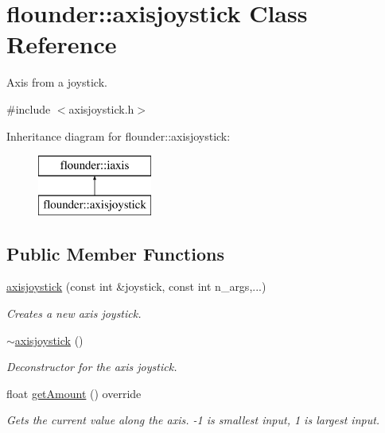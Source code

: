 \hypertarget{classflounder_1_1axisjoystick}{}\section{flounder\+:\+:axisjoystick Class Reference}
\label{classflounder_1_1axisjoystick}


Axis from a joystick.  




{\ttfamily \#include $<$axisjoystick.\+h$>$}

Inheritance diagram for flounder\+:\+:axisjoystick\+:\begin{figure}[H]
\begin{center}
\leavevmode
\includegraphics[height=2.000000cm]{classflounder_1_1axisjoystick}
\end{center}
\end{figure}
\subsection*{Public Member Functions}
\begin{DoxyCompactItemize}
\item 
\hyperlink{classflounder_1_1axisjoystick_a6415074e9ce0f9aae1d8071dc90a5f93}{axisjoystick} (const int \&joystick, const int n\+\_\+args,...)
\begin{DoxyCompactList}\small\item\em Creates a new axis joystick. \end{DoxyCompactList}\item 
\hyperlink{classflounder_1_1axisjoystick_aa006f728b79d1f0bd5101070782fcbb9}{$\sim$axisjoystick} ()
\begin{DoxyCompactList}\small\item\em Deconstructor for the axis joystick. \end{DoxyCompactList}\item 
float \hyperlink{classflounder_1_1axisjoystick_ace3ec0cbb5c9958fe8e8fb6996fc81c3}{get\+Amount} () override
\begin{DoxyCompactList}\small\item\em Gets the current value along the axis. -\/1 is smallest input, 1 is largest input. \end{DoxyCompactList}\end{DoxyCompactItemize}
